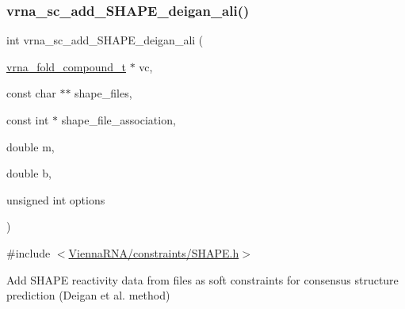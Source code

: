 \subsubsection{\texorpdfstring{vrna\_sc\_add\_SHAPE\_deigan\_ali()}{vrna\_sc\_add\_SHAPE\_deigan\_ali()}}
{\footnotesize\ttfamily int vrna\+\_\+sc\+\_\+add\+\_\+\+S\+H\+A\+P\+E\+\_\+deigan\+\_\+ali (\begin{DoxyParamCaption}\item[{\mbox{\hyperlink{group__fold__compound_ga1b0cef17fd40466cef5968eaeeff6166}{vrna\+\_\+fold\+\_\+compound\+\_\+t}} $\ast$}]{vc,  }\item[{const char $\ast$$\ast$}]{shape\+\_\+files,  }\item[{const int $\ast$}]{shape\+\_\+file\+\_\+association,  }\item[{double}]{m,  }\item[{double}]{b,  }\item[{unsigned int}]{options }\end{DoxyParamCaption})}



{\ttfamily \#include $<$\mbox{\hyperlink{SHAPE_8h}{Vienna\+R\+N\+A/constraints/\+S\+H\+A\+P\+E.\+h}}$>$}



Add S\+H\+A\+PE reactivity data from files as soft constraints for consensus structure prediction (Deigan et al. method) 


